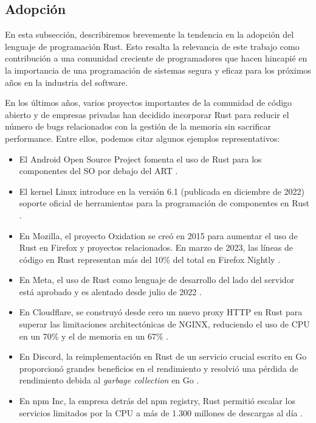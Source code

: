\subsection{Adopción}

En esta subsección, describiremos brevemente la tendencia en la adopción del lenguaje de
programación Rust. Esto resalta la relevancia de este trabajo como contribución a una
comunidad creciente de programadores que hacen hincapié en la importancia de una
programación de sistemas segura y eficaz para los próximos años en la industria del software.

En los últimos años, varios proyectos importantes de la comunidad de código abierto y de
empresas privadas han decidido incorporar Rust para reducir el número de bugs relacionados
con la gestión de la memoria sin sacrificar performance. Entre ellos, podemos citar algunos
ejemplos representativos:

\begin{itemize}
      \item El Android Open Source Project fomenta el uso de Rust para los componentes del
            SO por debajo del \acrfull{ART} \cite{stoep2021}.
      \item El kernel Linux introduce en la versión 6.1 (publicada en diciembre de 2022)
            soporte oficial de herramientas para la programación de componentes en Rust
            \cite{corbet2022,desimone2022}.
      \item En Mozilla, el proyecto Oxidation se creó en 2015 para aumentar el uso de Rust en
            Firefox y proyectos relacionados. En marzo de 2023, las líneas de código en Rust
            representan más del 10\% del total en Firefox Nightly \cite{mozilla-oxidation}.
      \item En Meta, el uso de Rust como lenguaje de desarrollo del lado del servidor está aprobado
            y es alentado desde julio de 2022 \cite{garcia2022}.
      \item En Cloudflare, se construyó desde cero un nuevo proxy HTTP en Rust para superar las
            limitaciones architectónicas de NGINX, reduciendo el uso de CPU en un 70\% y el de
            memoria en un 67\% \cite{wu2022}.
      \item En Discord, la reimplementación en Rust de un servicio crucial escrito en Go
            proporcionó grandes beneficios en el rendimiento y resolvió una pérdida de
            rendimiento debida al \emph{garbage collection} en Go \cite{howarth2020}.
      \item En npm Inc, la empresa detrás del npm registry, Rust permitió escalar los servicios limitados por
            la CPU a más de 1.300 millones de descargas al día \cite{rust-npm-case-study}.
\end{itemize}

